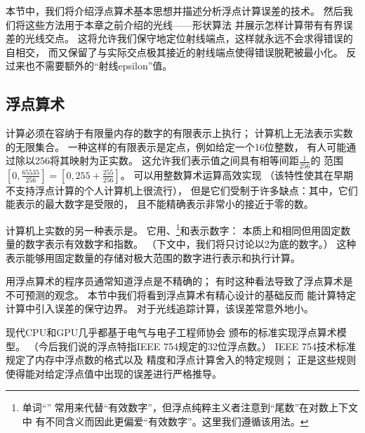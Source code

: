 本节中，我们将介绍浮点算术基本思想并描述分析浮点计算误差的技术。
然后我们将这些方法用于本章之前介绍的光线——形状算法
并展示怎样计算带有有界误差的光线交点。
这将允许我们保守地定位射线端点，这样就永远不会求得错误的自相交，
而又保留了与实际交点极其接近的射线端点使得错误脱靶被最小化。
反过来也不需要额外的“射线epsilon”值。

\subsection{浮点算术}\label{sub:浮点算术}
计算必须在容纳于有限量内存的数字的有限表示上执行；
计算机上无法表示实数的无限集合。
一种这样的有限表示是定点，例如给定一个16位整数，
有人可能通过除以256将其映射为正实数。
这允许我们表示值之间具有相等间距$\displaystyle\frac{1}{256}$的
范围$\displaystyle\left[0,\frac{65535}{256}\right]=\left[0,255+\frac{255}{256}\right]$。
可以用整数算术运算高效实现
（该特性使其在早期不支持浮点计算的个人计算机上很流行），
但是它们受制于许多缺点：其中，它们能表示的最大数字是受限的，
且不能精确表示非常小的接近于零的数。

计算机上实数的另一种表示是。
它用、\footnote{单词“\protect{}”
    常用来代替“有效数字”，但浮点纯粹主义者注意到“尾数”在对数上下文中
    有不同含义而因此更偏爱“有效数字”。这里我们遵循该用法。}和表示数字：
本质上和相同但用固定数量的数字表示有效数字和指数。
（下文中，我们将只讨论以2为底的数字。）
这种表示能够用固定数量的存储对极大范围的数字进行表示和执行计算。

用浮点算术的程序员通常知道浮点是不精确的；
有时这种看法导致了浮点算术是不可预测的观念。
本节中我们将看到浮点算术有精心设计的基础反而
能计算特定计算中引入误差的保守边界。
对于光线追踪计算，该误差常意外地小。

现代CPU和GPU几乎都基于电气与电子工程师协会
颁布的标准\parencite*{10.1109/IEEESTD.1985.82928,10.1109/IEEESTD.2008.4610935}实现浮点算术模型。
（今后我们说的浮点特指IEEE 754规定的32位浮点数。）
IEEE 754技术标准规定了内存中浮点数的格式以及
精度和浮点计算舍入的特定规则；
正是这些规则使得能对给定浮点值中出现的误差进行严格推导。


